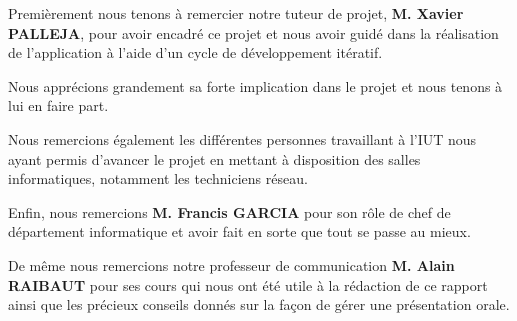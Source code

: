 


Premièrement nous tenons à remercier notre tuteur de projet, \textbf{M. Xavier PALLEJA}, pour avoir encadré ce projet et nous avoir guidé dans la réalisation de l'application à l'aide d'un cycle de développement itératif.

Nous apprécions grandement sa forte implication dans le projet et nous tenons à lui en faire part.

\bigbreak

Nous remercions également les différentes personnes travaillant à l'IUT nous ayant permis d'avancer le projet en mettant à disposition des salles informatiques, notamment les techniciens réseau.

\bigbreak
Enfin, nous remercions \textbf{M. Francis GARCIA} pour son rôle de chef de département informatique et avoir fait en sorte que tout se passe au mieux.

De même nous remercions notre professeur de communication \textbf{M. Alain RAIBAUT} pour ses cours qui nous ont été utile à la rédaction de ce rapport ainsi que les précieux conseils donnés sur la façon de gérer une présentation orale.
